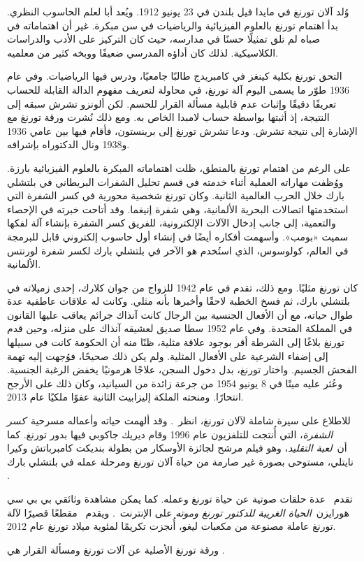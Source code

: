 \documentclass[../../../include/open-logic-section]{subfiles}
\begin{document}


وُلد آلان تورنغ في مايدا فيل بلندن في 23 يونيو 1912. ويُعد أبا لعلم
الحاسوب النظري. بدأ اهتمام تورنغ بالعلوم الفيزيائية والرياضيات في سن
مبكرة. غير أن اهتماماته في صباه لم تلق تمثيلًا حسنًا في مدارسه، حيث
كان التركيز على الأدب والدراسات الكلاسيكية. لذلك كان أداؤه المدرسي
ضعيفًا ووبخه كثير من معلميه.


التحق تورنغ بكلية كينغز في كامبريدج طالبًا جامعيًا، ودرس فيها
الرياضيات. وفي عام 1936 طوّر ما يسمى اليوم آلة تورنغ، في محاولة لتعريف
مفهوم الدالة القابلة للحساب تعريفًا دقيقًا وإثبات عدم قابلية مسألة
القرار للحسم. لكن ألونزو تشرش سبقه إلى النتيجة، إذ أثبتها بواسطة حساب
لامبدا الخاص به. ومع ذلك نُشرت ورقة تورنغ مع الإشارة إلى نتيجة تشرش.
ودعا تشرش تورنغ إلى برينستون، فأقام فيها بين عامي 1936 و1938 ونال
الدكتوراه بإشرافه.

على الرغم من اهتمام تورنغ بالمنطق، ظلت اهتماماته المبكرة بالعلوم
الفيزيائية بارزة. ووُظفت مهاراته العملية أثناء خدمته في قسم تحليل
الشفرات البريطاني في بلتشلي بارك خلال الحرب العالمية الثانية. وكان
تورنغ شخصية محورية في كسر الشفرة التي استخدمتها اتصالات البحرية
الألمانية، وهي شفرة إنيغما. وقد أتاحت خبرته في الإحصاء والتعمية، إلى
جانب إدخال الآلات الإلكترونية، للفريق كسر الشفرة بإنشاء آلة لفكها
سميت «بومب». وأسهمت أفكاره أيضًا في إنشاء أول حاسوب إلكتروني قابل
للبرمجة في العالم، كولوسوس، الذي استُخدم هو الآخر في بلتشلي بارك لكسر
شفرة لورنتس الألمانية.

كان تورنغ مثليًا. ومع ذلك، تقدم في عام 1942 للزواج من جوان كلارك، إحدى
زميلاته في بلتشلي بارك، ثم فسخ الخطبة لاحقًا وأخبرها بأنه مثلي. وكانت
له علاقات عاطفية عدة طوال حياته، مع أن الأفعال الجنسية بين الرجال
كانت آنذاك جرائم يعاقب عليها القانون في المملكة المتحدة. وفي عام 1952
سطا صديق لعشيقه آنذاك على منزله، وحين قدم تورنغ بلاغًا إلى الشرطة أقر
بوجود علاقة مثلية، ظنًا منه أن الحكومة كانت في سبيلها إلى إضفاء
الشرعية على الأفعال المثلية. ولم يكن ذلك صحيحًا، فوُجهت إليه تهمة
الفحش الجسيم. واختار تورنغ، بدل دخول السجن، علاجًا هرمونيًا يخفض
الرغبة الجنسية. وعُثر عليه ميتًا في 8 يونيو 1954 من جرعة زائدة من
السيانيد، وكان ذلك على الأرجح انتحارًا. ومنحته الملكة إليزابيث الثانية
عفوًا ملكيًا عام 2013.

\begin{reading}
للاطلاع على سيرة شاملة لآلان تورنغ، انظر~\citet{Hodges2014}. وقد ألهمت
حياته وأعماله مسرحية~\emph{كسر الشفرة}، التي أُنتجت للتلفزيون عام 1996
وقام ديريك جاكوبي فيها بدور تورنغ. كما أن~\emph{لعبة التقليد}، وهو
فيلم مرشح لجائزة الأوسكار من بطولة بنديكت كامبرباتش وكيرا نايتلي،
مستوحى بصورة غير صارمة من حياة آلان تورنغ ومرحلة عمله في بلتشلي بارك
\citep{Imitation2014}.

تقدم~\citet{Radiolab2012} عدة حلقات صوتية عن حياة تورنغ وعمله. كما
يمكن مشاهدة وثائقي بي بي سي هورايزن~\emph{الحياة الغريبة للدكتور
  تورنغ وموته} على الإنترنت~\citep{Sykes1992}. ويقدم~\citep{Theelen2012}
مقطعًا قصيرًا لآلة تورنغ عاملة مصنوعة من مكعبات ليغو، أُنجزت تكريمًا
لمئوية ميلاد تورنغ عام 2012.

ورقة تورنغ الأصلية عن آلات تورنغ ومسألة القرار هي
\citet{Turing1937}.
\end{reading}
\end{document}
